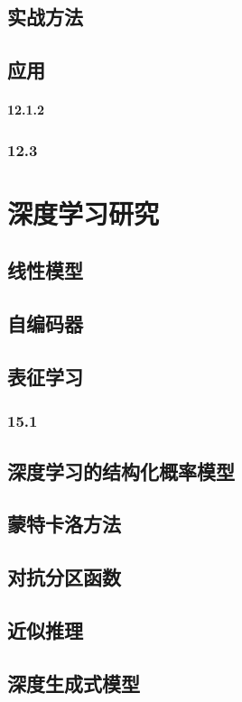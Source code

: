 \documentclass[a4paper,11pt]{book}
\begin{document}
\chapter{实战方法}
\label{chap:11}

\chapter{应用}
\label{chap:12}


\subsection{12.1.2}
\label{sec:12.1.2}

\section{12.3}
\label{sec:12.3}

\part{深度学习研究}
\label{part:3}

\chapter{线性模型}
\label{chap:13}

\chapter{自编码器}
\label{chap:14}


\chapter{表征学习}
\label{chap:15}


\section{15.1}
\label{sec:15.1}

\chapter{深度学习的结构化概率模型}
\label{chap:16}

\chapter{蒙特卡洛方法}
\label{chap:17}


\chapter{对抗分区函数}
\label{chap:18}

\chapter{近似推理}
\label{chap:19}

\chapter{深度生成式模型}
\label{chap:20}
\end{document}
